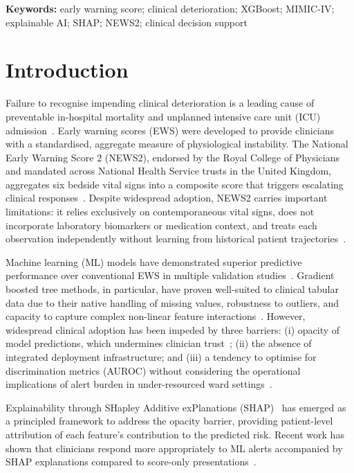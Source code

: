 \documentclass[12pt]{article}
\begin{document}
\noindent\textbf{Keywords:} early warning score; clinical deterioration;
XGBoost; MIMIC-IV; explainable AI; SHAP; NEWS2; clinical decision support

\newpage

\section*{Introduction}

Failure to recognise impending clinical deterioration is a leading cause of
preventable in-hospital mortality and unplanned intensive care unit (ICU)
admission~\cite{smith2013, kause2004}. Early warning scores (EWS) were
developed to provide clinicians with a standardised, aggregate measure of
physiological instability. The National Early Warning Score 2 (NEWS2),
endorsed by the Royal College of Physicians and mandated across National Health
Service trusts in the United Kingdom, aggregates six bedside vital signs into a
composite score that triggers escalating clinical responses~\cite{news2}.
Despite widespread adoption, NEWS2 carries important limitations: it relies
exclusively on contemporaneous vital signs, does not incorporate laboratory
biomarkers or medication context, and treats each observation independently
without learning from historical patient trajectories~\cite{prytherch2010,
moons2012}.

Machine learning (ML) models have demonstrated superior predictive performance
over conventional EWS in multiple validation studies~\cite{henry2015,
escobar2020, breiman2001_rf, chen2016_xgb}. Gradient boosted tree methods,
in particular, have proven well-suited to clinical tabular data due to their
native handling of missing values, robustness to outliers, and capacity to
capture complex non-linear feature interactions~\cite{chen2016_xgb}. However,
widespread clinical adoption has been impeded by three barriers: (i) opacity of
model predictions, which undermines clinician trust~\cite{holzinger2017};
(ii) the absence of integrated deployment infrastructure; and (iii) a tendency
to optimise for discrimination metrics (AUROC) without considering the
operational implications of alert burden in under-resourced ward
settings~\cite{shah2019}.

Explainability through SHapley Additive exPlanations (SHAP)~\cite{lundberg2017}
has emerged as a principled framework to address the opacity barrier, providing
patient-level attribution of each feature's contribution to the predicted risk.
Recent work has shown that clinicians respond more appropriately to ML alerts
accompanied by SHAP explanations compared to score-only
presentations~\cite{yang2023_shap}.
\end{document}
